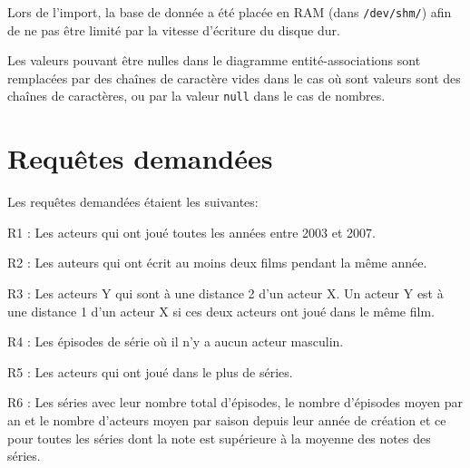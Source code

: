 \documentclass[a4paper,12pt]{article}
\begin{document}
Lors de l'import, la base de donnée a été placée en RAM (dans
\texttt{/dev/shm/}) afin de ne pas être limité par la vitesse d'écriture du
disque dur.

Les valeurs pouvant être nulles dans le diagramme entité-associations
sont remplacées par des chaînes de caractère vides dans le cas où sont
valeurs sont des chaînes de caractères, ou par la valeur \texttt{null}
dans le cas de nombres.
\section{Requêtes demandées}
Les requêtes demandées étaient les suivantes:
\begin{list}{-}{}
  \item R1 : Les acteurs qui ont joué toutes les années entre 2003 et
    2007.
  \item R2 : Les auteurs qui ont écrit au moins deux films pendant la
    même année.
  \item R3 : Les acteurs Y qui sont à une distance 2 d'un acteur X. Un
    acteur Y est à une distance 1 d'un acteur X si ces deux acteurs
    ont joué dans le même film.
  \item R4 : Les épisodes de série où il n'y a aucun acteur masculin.
  \item R5 : Les acteurs qui ont joué dans le plus de séries.
  \item R6 : Les séries avec leur nombre total d'épisodes, le nombre
    d'épisodes moyen par an et le nombre d'acteurs moyen par saison
    depuis leur année de création et ce pour toutes les séries dont la
    note est supérieure à la moyenne des notes des séries.
\end{list}
\end{document}

